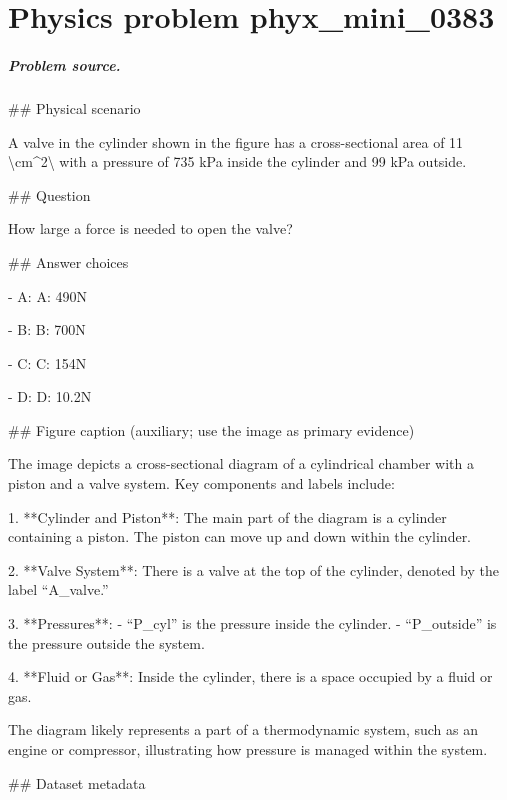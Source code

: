 
\chapter{Physics problem phyx\_mini\_0383}
\label{ch:PhyXMiniProblems_problem_phyx_mini_0383}

\paragraph{Problem source.}
\#\# Physical scenario

A valve in the cylinder shown in the figure has a cross-sectional area of 11 \textbackslash{}cm\textasciicircum{}2\textbackslash{} with a pressure of 735 kPa inside the cylinder and 99 kPa outside.

\#\# Question

How large a force is needed to open the valve?

\#\# Answer choices

- A: A: 490N

- B: B: 700N

- C: C: 154N

- D: D: 10.2N

\#\# Figure caption (auxiliary; use the image as primary evidence)

The image depicts a cross-sectional diagram of a cylindrical chamber with a piston and a valve system. Key components and labels include:

1. **Cylinder and Piston**: The main part of the diagram is a cylinder containing a piston. The piston can move up and down within the cylinder.

2. **Valve System**: There is a valve at the top of the cylinder, denoted by the label “A\_valve.”

3. **Pressures**: 
   - “P\_cyl” is the pressure inside the cylinder.
   - “P\_outside” is the pressure outside the system.

4. **Fluid or Gas**: Inside the cylinder, there is a space occupied by a fluid or gas.

The diagram likely represents a part of a thermodynamic system, such as an engine or compressor, illustrating how pressure is managed within the system.

\#\# Dataset metadata

